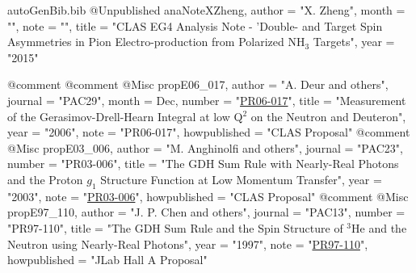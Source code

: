 \begin{filecontents*}{autoGenBib.bib}
@Unpublished{ anaNoteXZheng,
	author = "X. Zheng",
	month = "",
	note = "",
	title = "{CLAS EG4 Analysis Note - 'Double- and Target Spin Asymmetries in Pion Electro-production from Polarized NH$_3$ Targets}",
	year = "2015"
}

@comment %
@comment %
@Misc{ propE06_017,
	author = "A. Deur and others",
	journal = "PAC29",
	month = Dec,
	number = "\href{http://www.jlab.org/exp_prog/proposals/06/PR06-017.pdf}{PR06-017}",
	title = "{Measurement of the Gerasimov-Drell-Hearn Integral at low Q$^{2}$ on the Neutron and Deuteron}",
	year = "2006",
	note = "PR06-017",
	howpublished = "CLAS Proposal"
}
@comment %
@Misc{ propE03_006,
	author = "{M. Anghinolfi and others}",
	journal = "PAC23",
	number = "PR03-006",
	title = "{The GDH Sum Rule with Nearly-Real Photons and the Proton $g_1$ Structure Function at Low Momentum Transfer}",
	year = "2003",
	note = "\href{http://www.jlab.org/exp_prog/proposals/03/PR03-006.pdf}{PR03-006}",
	howpublished = "CLAS Proposal"
}
@comment %
@Misc{ propE97_110,
	author = "{J. P. Chen and others}",
	journal = "PAC13",
	number = "PR97-110",
	title = "{The GDH Sum Rule and the Spin Structure of $^3$He and the Neutron using Nearly-Real Photons}",
	year = "1997",
	note = "\href{http://www.jlab.org/exp_prog/proposals/97/PR97-110.pdf}{PR97-110}",
	howpublished = "JLab Hall A Proposal"
}


\end{filecontents*}
